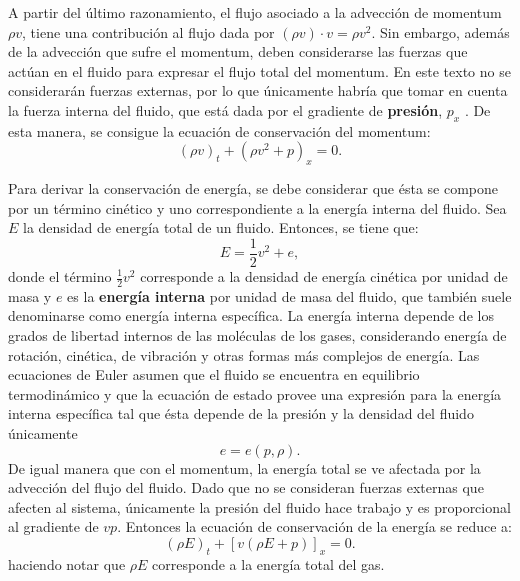 A partir del último razonamiento, el flujo asociado a la advección de momentum $\rho v$, tiene una contribución al flujo dada por $(\rho v) \cdot v = \rho v^2$. Sin embargo, además de la advección que sufre el momentum, deben considerarse las fuerzas que actúan en el fluido para expresar el flujo total del momentum. En este texto no se considerarán fuerzas externas, por lo que únicamente habría que tomar en cuenta la fuerza interna del fluido, que está dada por el gradiente de \textbf{presión}, $p_x$ \cite{LeVeque}. De esta manera, se consigue la ecuación de conservación del momentum:
\begin{equation}
	(\rho v)_t + (\rho v^{2} + p)_{x} = 0.
	\label{eq:momentum-euler}
\end{equation}

Para derivar la conservación de energía, se debe considerar que ésta se compone por un término cinético y uno correspondiente a la energía interna del fluido. Sea $E$ la densidad de energía total de un fluido. Entonces, se tiene que:
\begin{equation}
	E = \frac{1}{2} v^{2} + e,
	\label{eq:energia}
\end{equation}
donde el término $\frac{1}{2} v^{2}$ corresponde a la densidad de energía cinética por unidad de masa y $e$ es la \textbf{energía interna} por unidad de masa del fluido, que también suele denominarse como energía interna específica. La energía interna depende de los grados de libertad internos de las moléculas de los gases, considerando energía de rotación, cinética, de vibración y otras formas más complejos de energía. Las ecuaciones de Euler asumen que el fluido se encuentra en equilibrio termodinámico y que la ecuación de estado provee una expresión para la energía interna específica tal que ésta depende de la presión y la densidad del fluido únicamente
\begin{equation}
	e = e(p, \rho).
\end{equation}
De igual manera que con el momentum, la energía total se ve afectada por la advección del flujo del fluido. Dado que no se consideran fuerzas externas que afecten al sistema, únicamente la presión del fluido hace trabajo y es proporcional al gradiente de $vp$. Entonces la ecuación de conservación de la energía se reduce a:
\begin{equation}
	(\rho E)_{t} + [v(\rho E + p)]_{x} = 0.
	\label{eq:energia-euler}
\end{equation}
haciendo notar que $\rho E$ corresponde a la energía total del gas.

